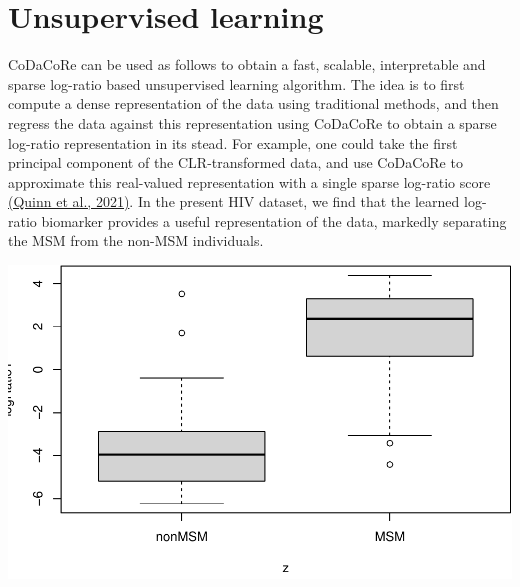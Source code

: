 \documentclass[
]{article}
\newenvironment{Shaded}{\begin{snugshade}}{\end{snugshade}}
\newcommand{\AttributeTok}[1]{\textcolor[rgb]{0.77,0.63,0.00}{#1}}
\newcommand{\ControlFlowTok}[1]{\textcolor[rgb]{0.13,0.29,0.53}{\textbf{#1}}}
\newcommand{\DecValTok}[1]{\textcolor[rgb]{0.00,0.00,0.81}{#1}}
\newcommand{\FunctionTok}[1]{\textcolor[rgb]{0.00,0.00,0.00}{#1}}
\newcommand{\NormalTok}[1]{#1}
\newcommand{\OtherTok}[1]{\textcolor[rgb]{0.56,0.35,0.01}{#1}}
\newcommand{\SpecialCharTok}[1]{\textcolor[rgb]{0.00,0.00,0.00}{#1}}
\begin{document}
\hypertarget{unsupervised-learning}{%
\section{Unsupervised learning}\label{unsupervised-learning}}

CoDaCoRe can be used as follows to obtain a fast, scalable,
interpretable and sparse log-ratio based unsupervised learning
algorithm. The idea is to first compute a dense representation of the
data using traditional methods, and then regress the data against this
representation using CoDaCoRe to obtain a sparse log-ratio
representation in its stead. For example, one could take the first
principal component of the CLR-transformed data, and use CoDaCoRe to
approximate this real-valued representation with a single sparse
log-ratio score \href{https://arxiv.org/abs/2104.07266}{(Quinn et al.,
2021)}. In the present HIV dataset, we find that the learned log-ratio
biomarker provides a useful representation of the data, markedly
separating the MSM from the non-MSM individuals.

\begin{Shaded}
\end{Shaded}

\includegraphics{guide_files/figure-latex/unnamed-chunk-22-1.pdf}
\end{document}
